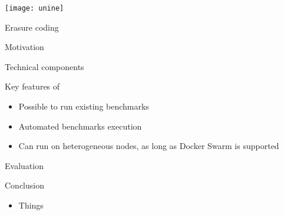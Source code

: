 



\begin{frame}[plain]
  
\titlepage

\begin{center}
\texttt{[image: unine]}
\end{center}

\end{frame}


\subtitle[Introduction]{Introduction}

\begin{frame}{Erasure coding}
\end{frame}

\begin{frame}{Motivation}
\end{frame}

\subtitle[Architecture]{Architecture}

\begin{frame}{Technical components}
    \centering
    
\end{frame}

\begin{frame}{Key features of \sys}
    \begin{itemize}
        \item Possible to run existing benchmarks
        \item Automated benchmarks execution
        \item Can run on heterogeneous nodes, as long as Docker Swarm is supported
    \end{itemize}
\end{frame}

\subtitle[Evaluation]{Evaluation}

\begin{frame}{Evaluation}
\end{frame}

\subtitle[Conclusion]{Conclusion}

\begin{frame}{Conclusion}
    \begin{itemize}
        \item Things
    \end{itemize}
\end{frame}




